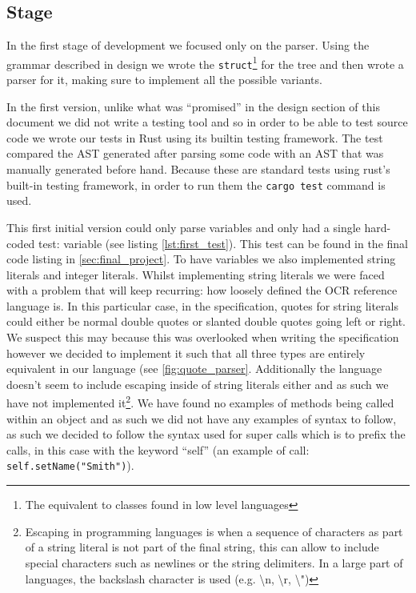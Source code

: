 \documentclass{article}
\newcommand{\subsecnum}{\the\value{subsection}}
\begin{document}
\subsection{Stage \subsecnum}

In the first stage of development we focused only on the parser. Using the
grammar described in design we wrote the \texttt{struct}\footnote{The
equivalent to classes found in low level languages} for the tree and then wrote
a parser for it, making sure to implement all the possible variants.

In the first version, unlike what was ``promised'' in the design section of
this document we did not write a testing tool and so in order to be able to
test source code we wrote our tests in Rust using its builtin testing
framework. The test compared the AST generated after parsing some code with an
AST that was manually generated before hand. Because these are standard tests
using rust's built-in testing framework, in order to run them the \texttt{cargo
test} command is used.

This first initial version could only parse variables and only had a single
hard-coded test: variable (see listing \ref{lst:first_test}). This test can be
found in the final code listing in \autoref{sec:final_project}. To have
variables we also implemented string literals and integer literals. Whilst
implementing string literals we were faced with a problem that will keep
recurring: how loosely defined the OCR reference language is. In this
particular case, in the specification, quotes for string literals could either
be normal double quotes or slanted double quotes going left or right. We
suspect this may because this was overlooked when writing the specification
however we decided to implement it such that all three types are entirely
equivalent in our language (see \autoref{fig:quote_parser}. Additionally the
language doesn't seem to include escaping inside of string literals either and
as such we have not implemented it\footnote{Escaping in programming languages
is when a sequence of characters as part of a string literal is not part of the
final string, this can allow to include special characters such as newlines or
the string delimiters. In a large part of languages, the backslash character is
used (e.g. \textbackslash{}n, \textbackslash{}r, \textbackslash{}")}. We have
found no examples of methods being called within an object and as such we did
not have any examples of syntax to follow, as such we decided to follow the
syntax used for super calls which is to prefix the calls, in this case with the
keyword ``self'' (an example of call:
\texttt{self.setName("Smith")}).
\end{document}
